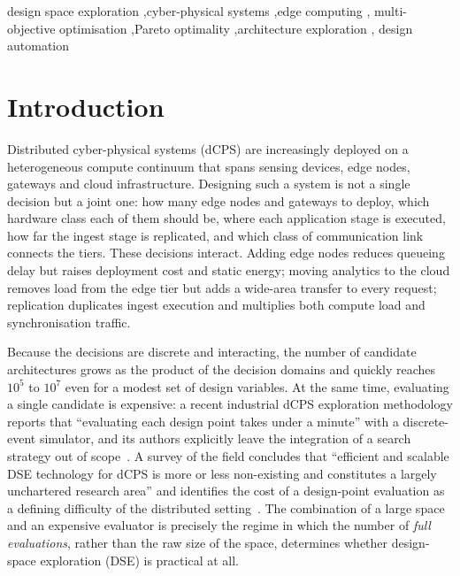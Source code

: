 \documentclass[preprint,11pt,3p]{elsarticle}
\theoremstyle{plain}
\theoremstyle{definition}
\begin{document}
\begin{frontmatter}
\begin{keyword}
design space exploration \sep cyber-physical systems \sep edge computing \sep
multi-objective optimisation \sep Pareto optimality \sep architecture exploration \sep
design automation
\end{keyword}

\end{frontmatter}

\section{Introduction}
\label{sec:intro}

Distributed cyber-physical systems (dCPS) are increasingly deployed on a heterogeneous
compute continuum that spans sensing devices, edge nodes, gateways and cloud
infrastructure. Designing such a system is not a single decision but a joint one: how
many edge nodes and gateways to deploy, which hardware class each of them should be,
where each application stage is executed, how far the ingest stage is replicated, and
which class of communication link connects the tiers. These decisions interact. Adding
edge nodes reduces queueing delay but raises deployment cost and static energy; moving
analytics to the cloud removes load from the edge tier but adds a wide-area transfer to
every request; replication duplicates ingest execution and multiplies both compute load
and synchronisation traffic.

Because the decisions are discrete and interacting, the number of candidate
architectures grows as the product of the decision domains and quickly reaches $10^{5}$
to $10^{7}$ even for a modest set of design variables. At the same time, evaluating a
single candidate is expensive: a recent industrial dCPS exploration methodology reports
that ``evaluating each design point takes under a minute'' with a discrete-event
simulator, and its authors explicitly leave the integration of a search strategy out of
scope~\cite{saadatmand2025compdse}. A survey of the field concludes that ``efficient and
scalable DSE technology for dCPS is more or less non-existing and constitutes a largely
unchartered research area'' and identifies the cost of a design-point evaluation as a
defining difficulty of the distributed setting~\cite{herget2022dse}. The combination of
a large space and an expensive evaluator is precisely the regime in which the number of
\emph{full evaluations}, rather than the raw size of the space, determines whether
design-space exploration (DSE) is practical at all.
\end{document}

